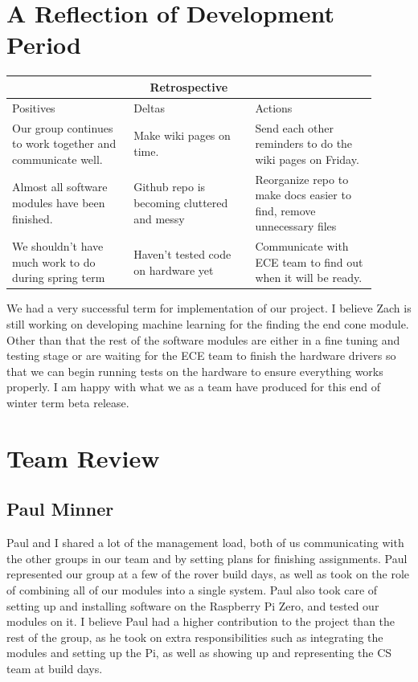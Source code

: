 \documentclass[10pt,letterpaper,onecolumn,draftclsnofoot,journal]{IEEEtran}
\begin{document}
\section{A Reflection of Development Period}
\begin{tabular}{ |p{0.3\linewidth}|p{0.3\linewidth}|p{0.3\linewidth}|  }
	\hline
	\multicolumn{3}{|c|}{Retrospective} \\
	\hline
	Positives& Deltas &Actions \\
	\hline
	Our group continues to work together and communicate well. &
	Make wiki pages on time.&
	Send each other reminders to do the wiki pages on Friday. \\
	
	Almost all software modules have been finished. &
	Github repo is becoming cluttered and messy &
	Reorganize repo to make docs easier to find, remove unnecessary files \\
	
	We shouldn't have much work to do during spring term &
	Haven't tested code on hardware yet & Communicate with ECE team to find out when it will be ready.  \\
	\hline
\end{tabular}

\vspace{1cm}
\par
We had a very successful term for implementation of our project. I believe Zach is still working on developing  machine learning for the finding the end cone module. Other than that the rest of the software modules are either in a fine tuning and testing stage or are waiting for the ECE team to finish the hardware drivers so that we can begin running tests on the hardware to ensure everything works properly. I am happy with what we as a team have produced for this end of winter term beta release.

\section{Team Review}
\subsection{Paul Minner}
Paul and I shared a lot of the management load, both of us communicating with the other groups in our team and by setting plans for finishing assignments. Paul represented our group at a few of the rover build days, as well as took on the role of combining all of our modules into a single system. Paul also took care of setting up and installing software on the Raspberry Pi Zero, and tested our modules on it. I believe Paul had a higher contribution to the project than the rest of the group, as he took on extra responsibilities such as integrating the modules and setting up the Pi, as well as showing up and representing the CS team at build days.
\end{document}
